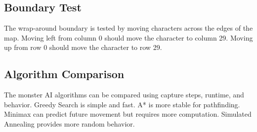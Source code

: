 \subsection{Boundary Test}

The wrap-around boundary is tested by moving characters across the edges of the map. Moving left from column 0 should move the character to column 29. Moving up from row 0 should move the character to row 29.

\subsection{Algorithm Comparison}

The monster AI algorithms can be compared using capture steps, runtime, and behavior. Greedy Search is simple and fast. A* is more stable for pathfinding. Minimax can predict future movement but requires more computation. Simulated Annealing provides more random behavior.
